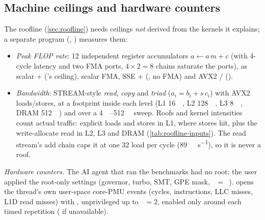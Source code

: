 \subsection{Machine ceilings and hardware counters}\label{sec:ceilings-method}
The roofline (\cref{sec:roofline}) needs ceilings \emph{not} derived from the kernels it explains;
a separate program (, ) measures them:
\begin{itemize}
  \item \emph{Peak FLOP rate}: \num{12} independent register accumulators $a \leftarrow a\,m + c$
        (with \num{4}-cycle latency and two FMA ports, $4\times2=8$ chains saturate the ports), as
        scalar + ('s ceiling), scalar FMA, SSE
        + (, no FMA) and AVX2 /
        ().
  \item \emph{Bandwidth}: STREAM-style \emph{read}, \emph{copy} and \emph{triad}
        ($a_i = b_i + s\,c_i$) with AVX2 loads/stores, at a footprint inside each level (L1
        \qty{16}{\kibi\byte}, L2 \qty{128}{\kibi\byte}, L3 \qty{8}{\mebi\byte}, DRAM
        \qty{512}{\mebi\byte}) and over a \qty{4}{\kibi\byte}--\qty{512}{\mebi\byte} sweep. Roofs and
        kernel intensities count actual traffic: explicit loads and stores in L1, where stores hit,
        plus the write-allocate read in L2, L3 and DRAM (\cref{tab:roofline-inputs}). The read
        stream's add chain caps it at one \qty{32}{\byte} load per cycle
        (\qty{89}{\gibi\byte\per\second}), so it is never a roof.
\end{itemize}
\emph{Hardware counters.} The AI agent that ran the benchmarks had no root; the user applied the
root-only settings (governor, turbo, SMT, GPE mask, ~$=$~\sysPerfParanoid{}).
 opens the thread's own user-space core-PMU events (cycles, instructions, LLC
misses, L1D read misses) with , unprivileged up to
~$=2$, enabled only around each timed repetition ( if
unavailable).
